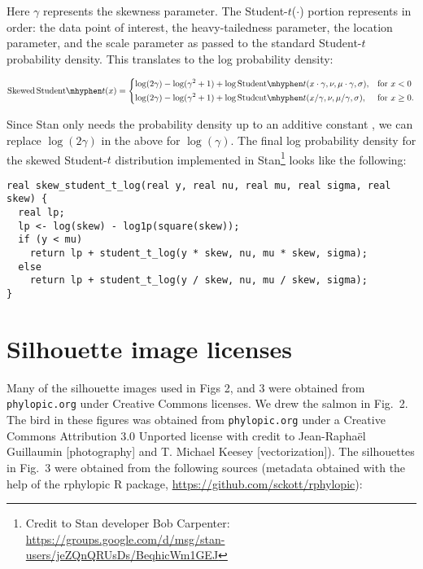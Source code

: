 \documentclass[12pt]{article}
\begin{document}
Here $\gamma$ represents the skewness parameter. The Student-$t$($\cdot$) portion
represents in order: the data point of interest, the heavy-tailedness
parameter, the location parameter, and the scale parameter as passed to the
standard Student-$t$ probability density. This translates to the log probability
density:

\begin{equation}
\mathrm{Skewed\,Student}\mhyphen t(x) =
\begin{dcases}
  \log (2 \gamma) - \log(\gamma^2 + 1) +
  \log \mathrm{Student}\mhyphen t(x \cdot \gamma, \nu, \mu \cdot \gamma, \sigma),& \text{for } x < 0\\
  \log (2 \gamma) - \log(\gamma^2 + 1) +
  \log \mathrm{Student}\mhyphen t(x / \gamma, \nu, \mu / \gamma, \sigma),& \text{for } x \ge 0.
\end{dcases}
\end{equation}

Since Stan only needs the probability density up to an additive
constant \citep{stan-manual2014}, we
can replace $\log(2 \gamma)$ in the above for $\log(\gamma)$. The final log
probability density for the skewed Student-$t$ distribution implemented in
Stan\footnote{Credit to Stan developer Bob Carpenter:
\url{https://groups.google.com/d/msg/stan-users/jeZQnQRUsDs/BeqhicWm1GEJ}}
looks like the following:

\begin{verbatim}
real skew_student_t_log(real y, real nu, real mu, real sigma, real skew) {
  real lp;
  lp <- log(skew) - log1p(square(skew));
  if (y < mu)
    return lp + student_t_log(y * skew, nu, mu * skew, sigma);
  else
    return lp + student_t_log(y / skew, nu, mu / skew, sigma);
}
\end{verbatim}

\section{Silhouette image licenses}

Many of the silhouette images used in Figs 2, and 3 were obtained from
\texttt{phylopic.org} under Creative Commons licenses. We drew the
salmon in Fig.~2. The bird in these figures was obtained
from \texttt{phylopic.org} under a Creative Commons Attribution 3.0 Unported
license with credit to Jean-Raphaël Guillaumin {[}photography{]} and T.
Michael Keesey {[}vectorization{]}). The silhouettes in
Fig.~3 were obtained from the following sources (metadata
obtained with the help of the rphylopic R package,
\url{https://github.com/sckott/rphylopic}):
\end{document}

